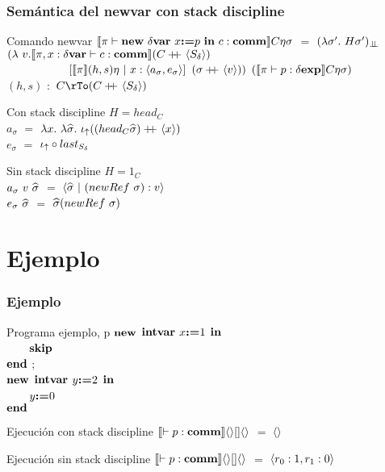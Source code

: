 \documentclass{beamer} %
\begin{document}
\begin{frame}\small
\frametitle{Sem\'antica del newvar con stack discipline}

\begin{block}{Comando newvar}
$\llbracket \pi \vdash \textbf{new} \ \delta \textbf{var} \ x \textbf{:=} p \ \textbf{in} \ c : \textbf{comm} \rrbracket C\eta\sigma$ $=$
$(\lambda \sigma' . \ H \sigma')_{\bot \!\!\! \bot}$\\
$(\lambda \ v . \llbracket \pi,x:\delta \textbf{var} \vdash c : \textbf{comm} \rrbracket(C+\kern-1.3ex+\kern0.8ex\langle S_\delta \rangle)$\\
\ \ \ \ \ \ \ \ \ \ \ $[\semBrcks{\pi}(h,s)\eta \ | \ x:\lrangles{a_\sigma,e_\sigma}]$
							$(\sigma +\kern-1.3ex+\kern0.8ex \langle v \rangle))$
$(\llbracket \pi \vdash p : \delta \textbf{exp} \rrbracket C\eta\sigma)$\\
$(h,s)$ $:$ $C \rTo (C \concat \lrangles{S_\delta})$
\end{block}

\begin{block}{Con stack discipline}
$H = head_C$\\
$a_\sigma$ $=$ $\lambda x. \ \lambda \widehat{\sigma} . \ \iota_{\uparrow} ((head_{C} \widehat{\sigma}) +\kern-1.3ex+\kern0.8ex \langle x \rangle)$\\
$e_\sigma$ $=$ $ \iota_{\uparrow} \circ last_{S_\delta}$
\end{block}

\begin{block}{Sin stack discipline}
$H = 1_C$\\
$a_\sigma \ v \ \widehat{\sigma}$ $=$ $ \lrangles{\sigmahat \ | \ (newRef \ \sigma):v} $\\
$e_\sigma \ \widehat{\sigma}$ $=$ $\widehat{\sigma}(newRef \ \sigma)$
\end{block}

\end{frame}

\section{Ejemplo}

\begin{frame}
\frametitle{Ejemplo}

\begin{block}{Programa ejemplo, p}
$\textbf{new}$ $\textbf{intvar}$ $x \textbf{:=} 1$ $\textbf{in}$\\
\ \ \ \ $\textbf{skip}$\\
$\textbf{end}$ $\textbf{;}$\\
$\textbf{new}$ $\textbf{intvar}$ $y \textbf{:=} 2$ $\textbf{in}$\\
\ \ \ \ $y \textbf{:=} 0$\\
$\textbf{end}$ 
\end{block}

\begin{block}{Ejecuci\'on con stack discipline}
$\llbracket \vdash p : \textbf{comm} \rrbracket\langle  \rangle[]\langle  \rangle$ $=$ $\langle  \rangle$
\end{block}

\begin{block}{Ejecuci\'on sin stack discipline}
$\llbracket \vdash p : \textbf{comm} \rrbracket\langle  \rangle[]\langle  \rangle$ $=$ $\langle r_0:1,r_1:0 \rangle$
\end{block}


\end{frame}
\end{document}
